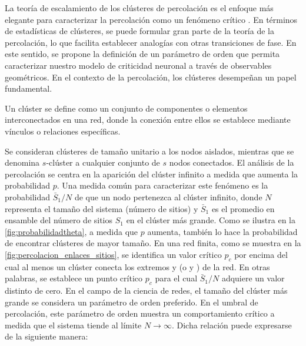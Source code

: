  
 
 
 
La teoría de escalamiento de los clústeres de percolación es el enfoque más elegante para caracterizar la percolación como un fenómeno crítico \cite{stauffer_scaling_1979}. En términos de estadísticas de clústeres, se puede formular gran parte de la teoría de la percolación, lo que facilita establecer analogías con otras transiciones de fase. En este sentido, se propone la definición de un parámetro de orden que permita caracterizar nuestro modelo de criticidad neuronal a través de observables geométricos. En el contexto de la percolación, los clústeres desempeñan un papel fundamental.
 
 
\begin{definition}[clúster] %
Un clúster se define como  un conjunto de componentes o elementos interconectados en una red, donde la conexión entre ellos se establece mediante vínculos o relaciones específicas.
\end{definition}

Se consideran clústeres de tamaño unitario a los nodos aislados, mientras que se denomina $s$-clúster a cualquier conjunto de $s$ nodos conectados. El análisis de la percolación se centra en la aparición del clúster infinito a medida que aumenta la probabilidad $p$. Una medida común para caracterizar este fenómeno es la probabilidad $\bar{S}_1/N$ de que un nodo pertenezca al clúster infinito, donde $N$ representa el tamaño del sistema (número de sitios) y $\bar{S}_1$ es el promedio en ensamble del número de sitios $S_1$ en el clúster más grande.  Como se ilustra en la \cref{fig:probabilidadtheta}, a medida que $p$ aumenta, también lo hace la probabilidad de encontrar clústeres de mayor tamaño. En una red finita, como se muestra en la \cref{fig:percolacion_enlaces_sitios}, se identifica un valor crítico $p_c$ por encima del cual al menos un clúster conecta los extremos  y  (o  y ) de la red. En otras palabras, se establece un punto crítico $p_c$ para el cual $\bar{S}_1/N$ adquiere un valor distinto de cero. En el campo de la ciencia de redes, el tamaño del clúster más grande se considera un parámetro de orden preferido. En el umbral de percolación, este parámetro de orden muestra un comportamiento crítico a medida que el sistema tiende al límite $N \to\infty$. Dicha relación puede expresarse de la siguiente manera:

